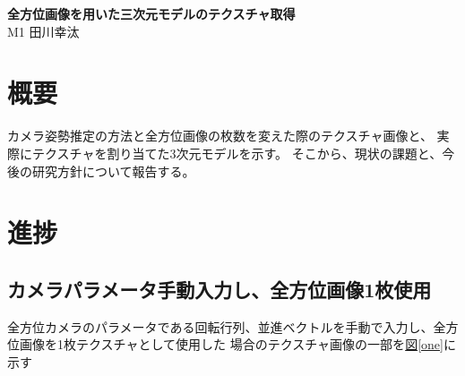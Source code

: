 \documentclass[]{jarticle}          %
\begin{document}

\vspace*{2ex}
\begin{center}
 {\Large \bf 全方位画像を用いた三次元モデルのテクスチャ取得}\\ %
 \vspace*{5mm}
 {\large M1 田川幸汰}%
\end{center}





\section{概要}
カメラ姿勢推定の方法と全方位画像の枚数を変えた際のテクスチャ画像と、
実際にテクスチャを割り当てた3次元モデルを示す。
そこから、現状の課題と、今後の研究方針について報告する。

\section{進捗}
\subsection{カメラパラメータ手動入力し、全方位画像1枚使用}
全方位カメラのパラメータである回転行列、並進ベクトルを手動で入力し、全方位画像を1枚テクスチャとして使用した
場合のテクスチャ画像の一部を\hyperref[one]{図\ref{one}}に示す
\end{document}

